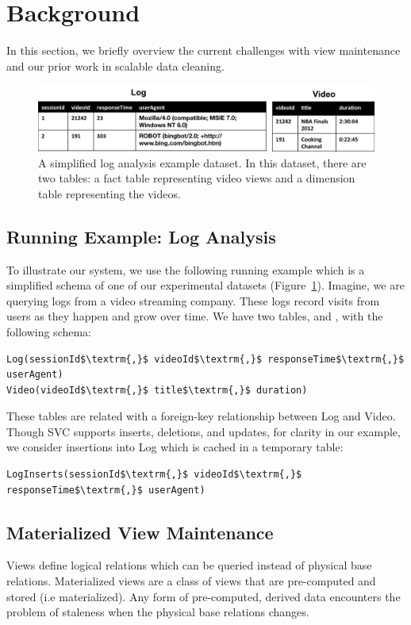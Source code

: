 \section{Background}\label{sec-background}
In this section, we briefly overview the current challenges with view maintenance and
our prior work in scalable data cleaning.

\begin{figure}[ht!] 
\centering
\vspace{-0.75em}
 \includegraphics[width=\columnwidth]{figs/sample-clean-example.png}\vspace{-0.25em}
 \caption{A simplified log analysis example dataset. In this dataset, there are two tables: a fact table representing video views and a dimension table representing the videos.\label{example-1}}
\end{figure}

\subsection{Running Example: Log Analysis}
To illustrate our system, we use the following running example which is a 
simplified schema of one of our experimental datasets (Figure~\ref{example-1}).
Imagine, we are querying logs from a video streaming company. 
These logs record visits from users as they happen and grow over time.
We have two tables,  and , with the following schema:

\begin{lstlisting}[mathescape]
Log(sessionId$\textrm{,}$ videoId$\textrm{,}$ responseTime$\textrm{,}$ userAgent)
Video(videoId$\textrm{,}$ title$\textrm{,}$ duration)
\end{lstlisting}
These tables are related with a foreign-key relationship between
Log and Video.
Though SVC supports inserts, deletions, and updates, for clarity in our example, we consider insertions
into Log which is cached in a temporary table:
\begin{lstlisting}[mathescape]
LogInserts(sessionId$\textrm{,}$ videoId$\textrm{,}$ responseTime$\textrm{,}$ userAgent)
\end{lstlisting}

\subsection{Materialized View Maintenance}\label{subsec-inc}
Views define logical relations which can be queried instead of physical base relations.
Materialized views are a class of views that are pre-computed and stored (i.e materialized).
Any form of pre-computed, derived data encounters the problem of staleness when the physical base relations changes.

